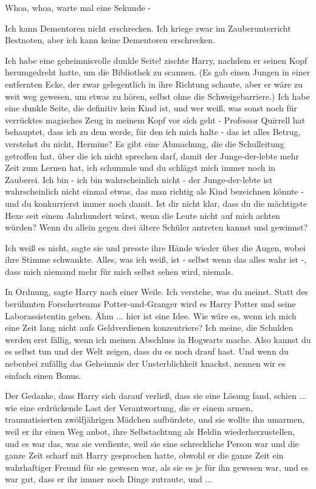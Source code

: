\glqq{}Whoa, whoa, warte mal eine Sekunde -\grqq{}

\glqq{}Ich kann Dementoren nicht erschrecken. Ich kriege zwar im Zauberunterricht
Bestnoten, aber ich kann keine Dementoren erschrecken.\grqq{}

\glqq{}Ich habe eine geheimnisvolle dunkle Seite!\grqq{} zischte Harry, nachdem
er seinen Kopf herumgedreht hatte, um die Bibliothek zu scannen. (Es gab einen
Jungen in einer entfernten Ecke, der zwar gelegentlich in ihre Richtung schaute,
aber er wäre zu weit weg gewesen, um etwas zu hören, selbst ohne die
Schweigebarriere.) \glqq{}Ich habe eine dunkle Seite, die definitiv kein Kind
ist, und wer weiß, was sonst noch für verrücktes magisches Zeug in meinem Kopf
vor sich geht - Professor Quirrell hat behauptet, dass ich zu dem werde, für den
ich mich halte - das ist alles Betrug, verstehst du nicht, Hermine? Es gibt eine
Abmachung, die die Schulleitung getroffen hat, über die ich nicht sprechen darf,
damit der Junge-der-lebte mehr Zeit zum Lernen hat, ich schummle und du schlägst
mich immer noch in Zauberei. Ich bin - ich bin wahrscheinlich nicht - der
Junge-der-lebte ist wahrscheinlich nicht einmal etwas, das man richtig als Kind
bezeichnen könnte - und du konkurrierst immer noch damit. Ist dir nicht klar,
dass du die mächtigste Hexe seit einem Jahrhundert wärst, wenn die Leute nicht
auf mich achten würden? Wenn du allein gegen drei ältere Schüler antreten kannst
und gewinnst?\grqq{}

\glqq{}Ich weiß es nicht\grqq{}, sagte sie und presste ihre Hände wieder über die
Augen, wobei ihre Stimme schwankte. \glqq{}Alles, was ich weiß, ist - selbst wenn
das alles wahr ist -, dass mich niemand mehr für mich selbst sehen wird,
niemals.\grqq{}

\glqq{}In Ordnung\grqq{}, sagte Harry nach einer Weile. \glqq{}Ich verstehe, was
du meinst. Statt des berühmten Forscherteams Potter-und-Granger wird es Harry
Potter und seine Laborassistentin geben. Ähm ... hier ist eine Idee. Wie wäre es,
wenn ich mich eine Zeit lang nicht aufs Geldverdienen konzentriere? Ich meine,
die Schulden werden erst fällig, wenn ich meinen Abschluss in Hogwarts mache.
Also kannst du es selbst tun und der Welt zeigen, dass du es noch drauf hast.
Und wenn du nebenbei zufällig das Geheimnis der Unsterblichkeit knackst, nennen
wir es einfach einen Bonus.\grqq{}

Der Gedanke, dass Harry sich darauf verließ, dass sie eine Lösung fand, schien
... wie eine erdrückende Last der Verantwortung, die er einem armen,
traumatisierten zwölfjährigen Mädchen aufbürdete, und sie wollte ihn umarmen,
weil er ihr einen Weg anbot, ihre Selbstachtung als Heldin wiederherzustellen,
und es war das, was sie verdiente, weil sie eine schreckliche Person war und die
ganze Zeit scharf mit Harry gesprochen hatte, obwohl er die ganze Zeit ein
wahrhaftiger Freund für sie gewesen war, als sie es je für ihn gewesen war, und
es war gut, dass er ihr immer noch Dinge zutraute, und ...

